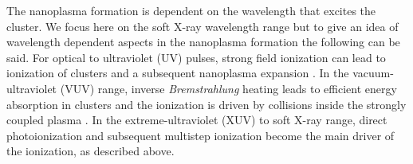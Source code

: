 %
The nanoplasma formation is dependent on the wavelength that excites the cluster. We focus here on the soft X-ray wavelength range but to give an idea of wavelength dependent aspects in the nanoplasma formation the following can be said. For optical to ultraviolet (UV) pulses, strong field ionization can lead to ionization of clusters and a subsequent nanoplasma expansion \citep{Springate-2000-PRA}. In the vacuum-ultraviolet (VUV) range, inverse \textit{Bremstrahlung} heating leads to efficient energy absorption in clusters and the ionization is driven by collisions inside the strongly coupled plasma \citep{Wabnitz-2002-Nature}. In the extreme-ultraviolet (XUV) to soft X-ray range, direct photoionization and subsequent multistep ionization become the main driver of the ionization, as described above.\\[1\baselineskip]
%
%
%
